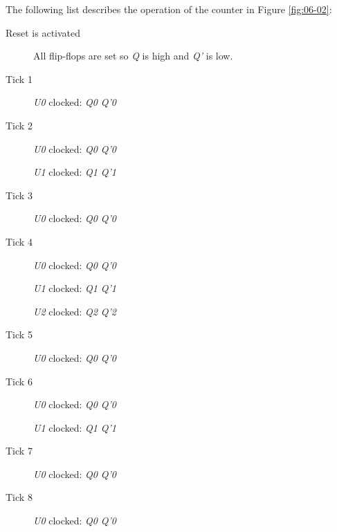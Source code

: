 The following list describes the operation of the counter in Figure \ref{fig:06-02}:

\begin{description}
	\item [Reset is activated] All flip-flops are set so \textit{Q} is high and \textit{Q'} is low.
	
	\item [Tick 1] \textit{U0} clocked: \textit{Q0} \textdownarrow \: \textemdash \: \textit{Q'0} \textuparrow

	\item [Tick 2] \textit{U0} clocked: \textit{Q0} \textuparrow \: \textemdash \: \textit{Q'0} \textdownarrow
	
	\hspace{14pt}\textit{U1} clocked: \textit{Q1} \textdownarrow \: \textemdash \: \textit{Q'1} \textuparrow
	
	\item [Tick 3] \textit{U0} clocked: \textit{Q0} \textdownarrow \: \textemdash \: \textit{Q'0} \textuparrow

	\item [Tick 4] \textit{U0} clocked: \textit{Q0} \textuparrow \: \textemdash \: \textit{Q'0} \textdownarrow
	
	\hspace{14pt}\textit{U1} clocked: \textit{Q1} \textuparrow \: \textemdash \: \textit{Q'1} \textdownarrow
	
	\hspace{14pt}\textit{U2} clocked: \textit{Q2} \textdownarrow \: \textemdash \: \textit{Q'2} \textuparrow

	\item [Tick 5] \textit{U0} clocked: \textit{Q0} \textdownarrow \: \textemdash \: \textit{Q'0} \textuparrow

	\item [Tick 6] \textit{U0} clocked: \textit{Q0} \textuparrow \: \textemdash \: \textit{Q'0} \textdownarrow
	
	\hspace{14pt}\textit{U1} clocked: \textit{Q1} \textdownarrow \: \textemdash \: \textit{Q'1} \textuparrow

	\item [Tick 7] \textit{U0} clocked: \textit{Q0} \textdownarrow \: \textemdash \: \textit{Q'0} \textuparrow

	\item [Tick 8] \textit{U0} clocked: \textit{Q0} \textuparrow \: \textemdash \: \textit{Q'0} \textdownarrow
	

\end{description}
